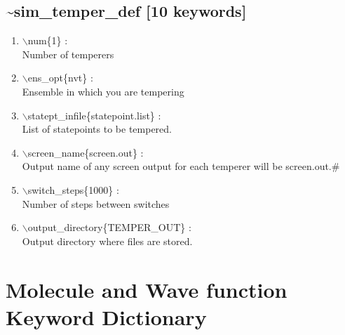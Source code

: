 \documentclass[12pt,titlepage]{article}
\begin{document}
\newpage
\newpage
\subsection*{\bf \~{}sim\_temper\_def [10 keywords]}

\begin{enumerate}

 \vspace{0.15in} 
 \item  $\backslash$num\{1\} : \\
   Number of temperers

 \vspace{0.15in} 
 \item  $\backslash$ens\_opt\{nvt\} : \\
   Ensemble in which you are tempering

 \vspace{0.15in} 
 \item  $\backslash$statept\_infile\{statepoint.list\} : \\
   List of statepoints to be tempered.

 \vspace{0.15in} 
 \item  $\backslash$screen\_name\{screen.out\} : \\
   Output name of any screen output for each temperer will be screen.out.\#

 \vspace{0.15in} 
 \item  $\backslash$switch\_steps\{1000\} : \\
   Number of steps between switches

 \vspace{0.15in} 
 \item  $\backslash$output\_directory\{TEMPER\_OUT\} : \\
   Output directory where files are stored.

\end{enumerate}
\newpage



\section{\bf Molecule and Wave function Keyword Dictionary} 
\end{document}
